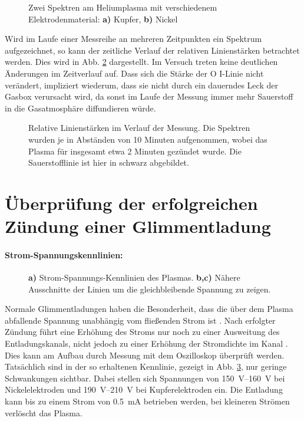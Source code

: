 \begin{figure}[h]
	\centering
	
	\caption{Zwei Spektren am Heliumplasma mit verschiedenem Elektrodenmaterial: \textbf{a)} Kupfer, \textbf{b)} Nickel}
	\label{fig:spektren}
\end{figure}

Wird im Laufe einer Messreihe an mehreren Zeitpunkten ein Spektrum aufgezeichnet, so kann der zeitliche Verlauf der relativen Linienstärken betrachtet werden. Dies wird in Abb. \ref{fig:spektralverlauf} dargestellt. Im Versuch treten keine deutlichen Änderungen im Zeitverlauf auf. Dass sich die Stärke der O I-Linie nicht verändert, impliziert wiederum, dass sie nicht durch ein dauerndes Leck der Gasbox verursacht wird, da sonst im Laufe der Messung immer mehr Sauerstoff in die Gasatmosphäre diffundieren würde.

\begin{figure}[h]
	\centering
	
	\caption{Relative Linienstärken im Verlauf der Messung. Die Spektren wurden je in Abständen von 10 Minuten aufgenommen, wobei das Plasma für insgesamt etwa 2 Minuten gezündet wurde. Die Sauerstofflinie ist hier in schwarz abgebildet.}
	\label{fig:spektralverlauf}
\end{figure}



\section{Überprüfung der erfolgreichen Zündung einer Glimmentladung}

\paragraph{Strom-Spannungskennlinien:}

\begin{figure}[h]
	\centering
	
	\caption{\textbf{a)} Strom-Spannungs-Kennlinien des Plasmas. \textbf{b,c)} Nähere Ausschnitte der Linien um die gleichbleibende Spannung zu zeigen.}
	\label{fig:kennlinien}
\end{figure}

Normale Glimmentladungen haben die Besonderheit, dass die über dem Plasma abfallende Spannung unabhängig vom fließenden Strom ist \cite{demtroederExperimentalphysik2013,franzLowPressurePlasmas2009}. Nach erfolgter Zündung führt eine Erhöhung des Stroms nur noch zu einer Ausweitung des Entladungskanals, nicht jedoch zu einer Erhöhung der Stromdichte im Kanal \cite{hansenConventionalNonconventionalDiagnostics2022}. Dies kann am Aufbau durch Messung mit dem Oszilloskop überprüft werden. Tatsächlich sind in der so erhaltenen Kennlinie, gezeigt in Abb. \ref{fig:kennlinien}, nur geringe Schwankungen sichtbar. Dabei stellen sich Spannungen von \qtyrange{150}{160}{V} bei Nickelelektroden und \qtyrange{190}{210}{V} bei Kupferelektroden ein. Die Entladung kann bis zu einem Strom von \qty{0.5}{\mA} betrieben werden, bei kleineren Strömen verlöscht das Plasma.


